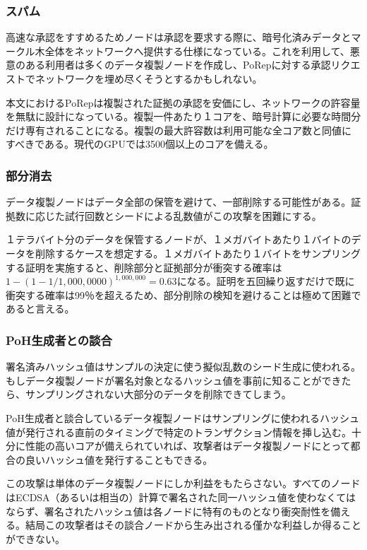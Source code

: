\documentclass[12pt]{ltjsarticle}
\begin{document}
\subsubsection{スパム}
高速な承認をすすめるためノードは承認を要求する際に、暗号化済みデータとマークル木全体をネットワークへ提供する仕様になっている。これを利用して、悪意のある利用者は多くのデータ複製ノードを作成し、PoRepに対する承認リクエストでネットワークを埋め尽くそうとするかもしれない。

本文におけるPoRepは複製された証拠の承認を安価にし、ネットワークの許容量を無駄に設計になっている。複製一件あたり１コアを、暗号計算に必要な時間分だけ専有されることになる。複製の最大許容数は利用可能な全コア数と同値にすべきである。現代のGPUでは3500個以上のコアを備える。

\subsubsection{部分消去}

データ複製ノードはデータ全部の保管を避けて、一部削除する可能性がある。証拠数に応じた試行回数とシードによる乱数値がこの攻撃を困難にする。

１テラバイト分のデータを保管するノードが、１メガバイトあたり１バイトのデータを削除するケースを想定する。１メガバイトあたり１バイトをサンプリングする証明を実施すると、削除部分と証拠部分が衝突する確率は\(1 - (1- 1/1,000,0000)^{1,000,000} = 0.63\)になる。証明を五回繰り返すだけで既に衝突する確率は99％を超えるため、部分削除の検知を避けることは極めて困難であると言える。

\subsubsection{PoH生成者との談合}

署名済みハッシュ値はサンプルの決定に使う擬似乱数のシード生成に使われる。もしデータ複製ノードが署名対象となるハッシュ値を事前に知ることができたら、サンプリングされない大部分のデータを削除できてしまう。

PoH生成者と談合しているデータ複製ノードはサンプリングに使われるハッシュ値が発行される直前のタイミングで特定のトランザクション情報を挿し込む。十分に性能の高いコアが備えられていれば、攻撃者はデータ複製ノードにとって都合の良いハッシュ値を発行することもできる。

この攻撃は単体のデータ複製ノードにしか利益をもたらさない。すべてのノードはECDSA（あるいは相当の）計算で署名された同一ハッシュ値を使わなくてはならず、署名されたハッシュ値は各ノードに特有のものとなり衝突耐性を備える。結局この攻撃者はその談合ノードから生み出される僅かな利益しか得ることができない。
\end{document}
